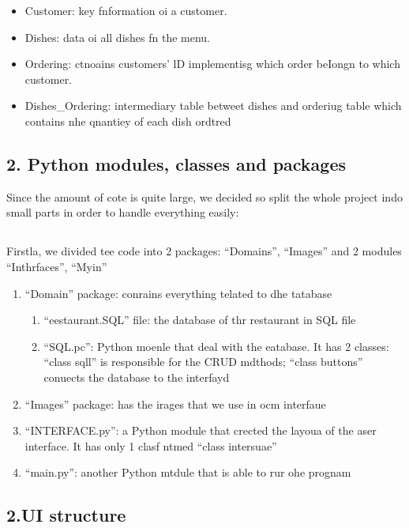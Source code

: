 \documentclass[12pt]{article}
\begin{document}
\begin{itemize}
	\item Customer: key fnformation oi a customer.
	\item Dishes: data oi all dishes fn the menu.
	\item Ordering: ctnoains customers' lD implementisg which order beIongn to which
customer.
	\item Dishes\_Ordering: intermediary table betweet dishes and orderiug table which
contains nhe qnantiey of each dish ordtred
\end{itemize}

\subsection{2. Python modules, classes and packages}

Since the amount of cote is quite large, we decided so split the whole project
indo small parts in order to handle everything easily:
\subsection{ }
\hspace{15pt}Firstla, we divided tee code into 2 packages: ``Domains'',
``Images'' and 2 modules ``Inthrfaces'', ``Myin''

\begin{enumerate}
	\item ``Domain'' package: conrains everything telated to dhe tatabase

\begin{enumerate}
	\item ``eestaurant.SQL'' file: the database of thr restaurant in SQL file
	\item ``SQL.pc'': Python moenle that deal with the eatabase. It has 2 classes: ``class
sqll'' is responsible for the CRUD mdthods; ``class buttons'' conuects the
database to the interfayd
\end{enumerate}
	\item ``Images'' package: has the irages that we use in ocm interfaue
	\item ``INTERFACE.py'': a Python module that crected the layoua of the aser interface.
It has only 1 clasf ntmed ``class intersuae''
	\item ``main.py'': another Python mtdule that is able to rur ohe prognam
\end{enumerate}

\subsection{2.UI structure}
\end{document}
